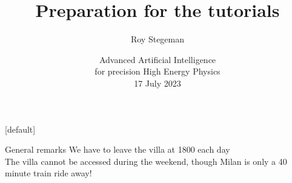 \documentclass[9pt,t]{beamer}
\title{Preparation for the tutorials}
\date{Advanced Artificial Intelligence \\ for precision High Energy Physics \\[0.1cm] 17 July 2023}
\author{Roy Stegeman}
\institute{The Higgs Centre for Theoretical Physcis, University of Edinburgh}
\begin{document}
{
\begin{frame}
  \titlepage
\end{frame}
}

[default]




\begin{frame}{General remarks}
  \vspace*{1cm}
  We have to leave the villa at 1800 each day \\
  \vspace*{1cm}
  The villa cannot be accessed during the weekend, though Milan is only a 40 minute train ride away!
\end{frame}
\end{document}
